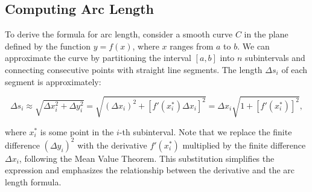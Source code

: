 \subsection*{Computing Arc Length}

\noindent To derive the formula for arc length, consider a smooth curve \( C \) in the plane defined by the function \( y = f(x) \), where \( x \) ranges from \( a \) to \( b \). We can approximate the curve by partitioning the interval \( [a, b] \) into \( n \) subintervals and connecting consecutive points with straight line segments. The length \( \Delta s_i \) of each segment is approximately:

\[
\Delta s_i \approx \sqrt{ \Delta x_i^2 + \Delta y_i^2 } = \sqrt{ (\Delta x_i)^2 + [f'(x_i^*) \Delta x_i]^2 } = \Delta x_i \sqrt{ 1 + [f'(x_i^*)]^2 },
\]

\noindent where \( x_i^* \) is some point in the \( i \)-th subinterval.  Note that we replace the finite difference \( (\Delta y_i)^2 \) with the derivative \( f'(x_i^*) \) multiplied by the finite difference \( \Delta x_i \), following the Mean Value Theorem. This substitution simplifies the expression and emphasizes the relationship between the derivative and the arc length formula. 

